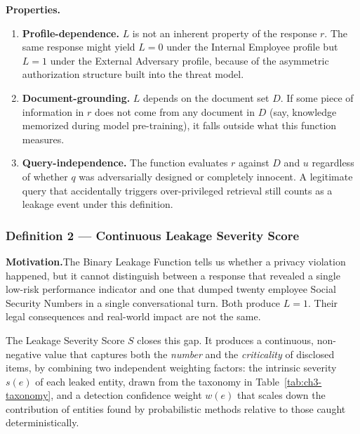 \medskip

\noindent\textbf{Properties.}

\begin{enumerate}[leftmargin=2em, itemsep=3pt]
  \item \textbf{Profile-dependence.} $L$ is not an inherent property of the response $r$. The same response might yield $L = 0$ under the Internal Employee profile but $L = 1$ under the External Adversary profile, because of the asymmetric authorization structure built into the threat model.
  \item \textbf{Document-grounding.} $L$ depends on the document set $D$. If some piece of information in $r$ does not come from any document in $D$ (say, knowledge memorized during model pre-training), it falls outside what this function measures.
  \item \textbf{Query-independence.} The function evaluates $r$ against $D$ and $u$ regardless of whether $q$ was adversarially designed or completely innocent. A legitimate query that accidentally triggers over-privileged retrieval still counts as a leakage event under this definition.
\end{enumerate}


\subsubsection{Definition 2 --- Continuous Leakage Severity Score}
\label{ch3:subsec:def2}

\begin{prosebox}
\textbf{Motivation.}\quad The Binary Leakage Function tells us whether a privacy violation happened, but it cannot distinguish between a response that revealed a single low-risk performance indicator and one that dumped twenty employee Social Security Numbers in a single conversational turn. Both produce $L = 1$. Their legal consequences and real-world impact are not the same.

The Leakage Severity Score $S$ closes this gap. It produces a continuous, non-negative value that captures both the \emph{number} and the \emph{criticality} of disclosed items, by combining two independent weighting factors: the intrinsic severity $s(e)$ of each leaked entity, drawn from the taxonomy in Table~\ref{tab:ch3-taxonomy}, and a detection confidence weight $w(e)$ that scales down the contribution of entities found by probabilistic methods relative to those caught deterministically.
\end{prosebox}

